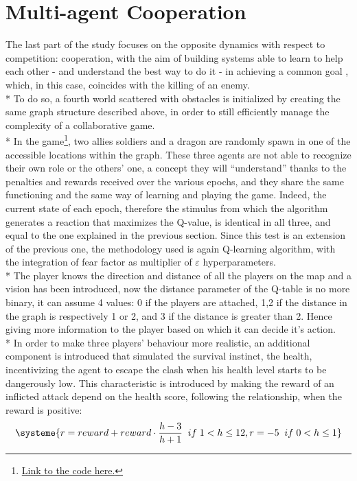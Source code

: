 \section{Multi-agent Cooperation}
The last part of the study focuses on the opposite dynamics with respect to competition: cooperation, with the aim of building systems able to learn to help each other - and understand the best way to do it - in achieving a common goal , which, in this case, coincides with the killing of an enemy.\\*
To do so, a fourth world scattered with obstacles is initialized by creating the same graph structure described above, in order to still efficiently manage the complexity of a collaborative game.\\*
In the game\footnote{\href{https://github.com/moiraghif/DragonHunting/tree/master/TeamWork}{Link to the code here.}}, two allies soldiers and a dragon are randomly spawn in one of the accessible locations within the graph. 
These three agents are not able to recognize their own role or the others' one, a concept they will ``understand'' thanks to the penalties and rewards received over the various epochs, and they share the same functioning and the same way of learning and playing the game. 
Indeed, the current state of each epoch, therefore the stimulus from which the algorithm generates a reaction that maximizes the Q-value, is identical in all three, and equal to the one explained in the previous section. Since this test is an extension of the previous one, the methodology used is again Q-learning algorithm, with the integration of fear factor as multiplier of $\varepsilon$ hyperparameters. \\*
The player knows the direction and distance of all the players on the map and a vision has been introduced, now the distance parameter of the Q-table is no more binary, it can assume 4 values: 0 if the players are attached, 1,2 if the distance in the graph is respectively 1 or 2, and 3 if the distance is greater than 2. Hence giving more information to the player based on which it can decide it's action.\\*
In order to make three players' behaviour more realistic, an additional component is introduced that simulated the survival instinct, the health, incentivizing the agent to escape the clash when his health level starts to be dangerously low. 
This characteristic is introduced by making the reward of an inflicted attack depend on the health score, following the relationship, when the reward is positive:
\[
\systeme{r = reward+reward\cdot\frac{h-3}{h+1}\;\;if\;1<h\leq 12, r = -5\;\;if\;0<h\leq 1}
\]

